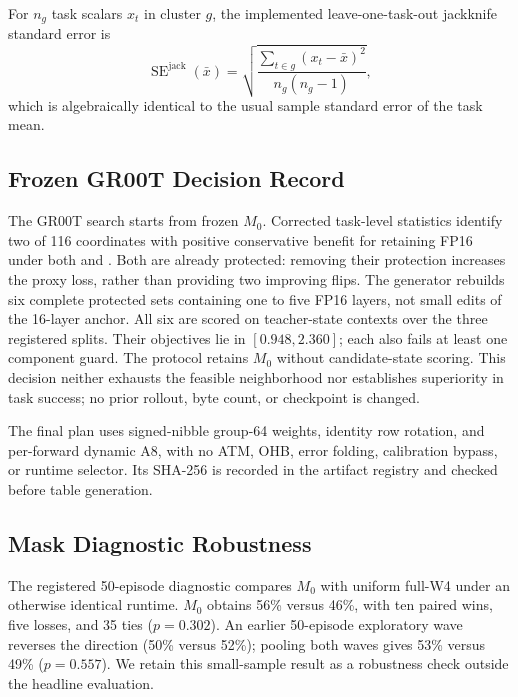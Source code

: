 For $n_g$ task scalars $x_t$ in cluster $g$, the implemented leave-one-task-out jackknife standard error is
\begin{equation}
 \operatorname{SE}^{\mathrm{jack}}(\bar{x})=
 \sqrt{\frac{\sum_{t\in g}(x_t-\bar{x})^2}{n_g(n_g-1)}},
 \label{eq:task_jackknife}
\end{equation}
which is algebraically identical to the usual sample standard error of the task mean.

\subsection{Frozen GR00T Decision Record}

The GR00T search starts from frozen $M_0$. Corrected task-level statistics identify two of 116 coordinates with positive conservative benefit for retaining FP16 under both \dfunc and \dpac. Both are already protected: removing their protection increases the proxy loss, rather than providing two improving flips. The generator rebuilds six complete protected sets containing one to five FP16 layers, not small edits of the 16-layer anchor. All six are scored on teacher-state contexts over the three registered splits. Their objectives lie in $[0.948,2.360]$; each also fails at least one component guard. The protocol retains $M_0$ without candidate-state scoring. This decision neither exhausts the feasible neighborhood nor establishes superiority in task success; no prior rollout, byte count, or checkpoint is changed.

The final plan uses signed-nibble group-64 weights, identity row rotation, and per-forward dynamic A8, with no ATM, OHB, error folding, calibration bypass, or runtime selector. Its SHA-256 is recorded in the artifact registry and checked before table generation.

\subsection{Mask Diagnostic Robustness}
\label{sec:mask_diagnostic}

The registered 50-episode diagnostic compares $M_0$ with uniform full-W4 under an otherwise identical runtime. $M_0$ obtains 56\% versus 46\%, with ten paired wins, five losses, and 35 ties ($p=0.302$). An earlier 50-episode exploratory wave reverses the direction (50\% versus 52\%); pooling both waves gives 53\% versus 49\% ($p=0.557$). We retain this small-sample result as a robustness check outside the headline evaluation.

